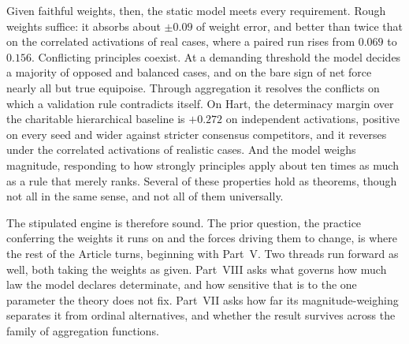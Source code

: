 Given faithful weights, then, the static model meets every requirement. Rough weights suffice: it absorbs about $\pm 0.09$ of weight error, and
better than twice that on the correlated activations of real cases, where a
paired run rises from $0.069$ to $0.156$. Conflicting principles coexist. At a demanding threshold the model decides
a majority of opposed and balanced cases, and on the bare sign of net force
nearly all but true equipoise. Through aggregation it resolves the
conflicts on which a validation rule contradicts itself. On Hart, the determinacy margin over the charitable hierarchical baseline is
$+0.272$ on independent activations, positive on every seed and wider against
stricter consensus competitors, and it reverses under the correlated
activations of realistic cases. And the model weighs magnitude, responding to
how strongly principles apply about ten times as much as a rule that merely
ranks. Several of these properties hold as theorems, though not all in the
same sense, and not all of them universally.

The stipulated engine is therefore sound. The prior question, the practice
conferring the weights it runs on and the forces driving them to change, is
where the rest of the Article turns, beginning with Part~V. Two threads run
forward as well, both taking the weights as given. Part~VIII asks what governs
how much law the model declares determinate, and how sensitive that is to the
one parameter the theory does not fix. Part~VII asks how far its
magnitude-weighing separates it from ordinal alternatives, and whether the
result survives across the family of aggregation functions.
